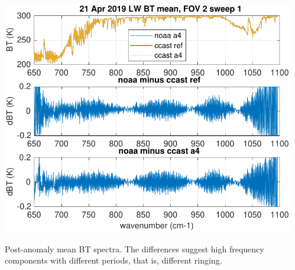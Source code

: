 \documentclass[10pt]{beamer}
\begin{document}
\begin{frame}
\begin{columns}[t]
\begin{column}{0.5\textwidth}
\end{column}
\begin{column}{0.5\textwidth}  
  \begin{centering}
  \includegraphics[width=\textwidth]{figures/LW_post_fail_BT_fov2_sd1.pdf}
  \end{centering}\vspace{3mm}
  Post-anomaly mean BT spectra. The differences suggest high
  frequency components with different periods, that is, different
  ringing.

\end{column}
\end{columns}
\end{frame}
\end{document}
